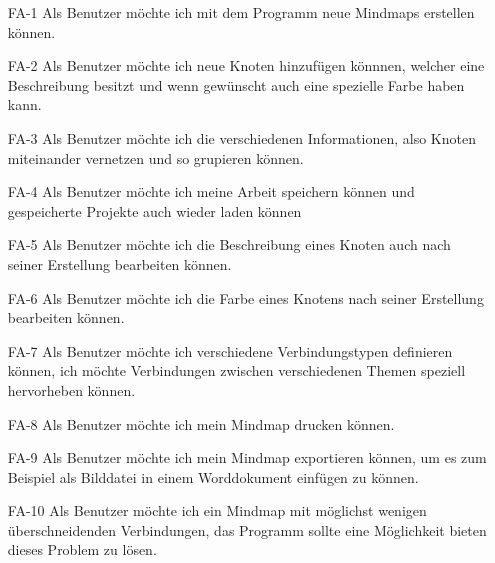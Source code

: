 \documentclass[a4paper,parskip]{scrartcl}
\begin{document}
\begin{enumerate}
\item[FA-1] Als Benutzer möchte ich mit dem Programm neue Mindmaps erstellen können.
\item[FA-2] Als Benutzer möchte ich neue Knoten hinzufügen könnnen, welcher eine Beschreibung besitzt und wenn gewünscht auch eine spezielle Farbe haben kann. 
\item[FA-3] Als Benutzer möchte ich die verschiedenen Informationen, also Knoten miteinander vernetzen und so grupieren können. 
\item[FA-4] Als Benutzer möchte ich meine Arbeit speichern können und gespeicherte Projekte auch wieder laden können
\item[FA-5] Als Benutzer möchte ich die Beschreibung eines Knoten auch nach seiner Erstellung bearbeiten können.
\item[FA-6] Als Benutzer möchte ich die Farbe eines Knotens nach seiner Erstellung bearbeiten können.
\item[FA-7] Als Benutzer möchte ich verschiedene Verbindungstypen definieren können, ich möchte Verbindungen zwischen verschiedenen Themen speziell hervorheben können. 
\item[FA-8] Als Benutzer möchte ich mein Mindmap drucken können.
\item[FA-9] Als Benutzer möchte ich mein Mindmap exportieren können, um es zum Beispiel als Bilddatei in einem Worddokument einfügen zu können.
\item[FA-10] Als Benutzer möchte ich ein Mindmap mit möglichst wenigen überschneidenden Verbindungen, das Programm sollte eine Möglichkeit bieten dieses Problem zu lösen.
\end{enumerate}
\end{document}

